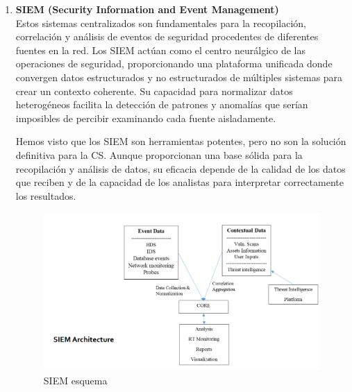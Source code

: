 \begin{enumerate}[resume]
\item \textbf{SIEM (Security Information and Event Management)} \\
Estos sistemas centralizados son fundamentales para la recopilación, correlación y análisis de eventos de seguridad procedentes de diferentes fuentes en la red. Los SIEM actúan como el centro neurálgico de las operaciones de seguridad, proporcionando una plataforma unificada donde convergen datos estructurados y no estructurados de múltiples sistemas para crear un contexto coherente. Su capacidad para normalizar datos heterogéneos facilita la detección de patrones y anomalías que serían imposibles de percibir examinando cada fuente aisladamente.

Hemos visto que los SIEM son herramientas potentes, pero no son la solución definitiva para la CS. Aunque proporcionan una base sólida para la recopilación y análisis de datos, su eficacia depende de la calidad de los datos que reciben y de la capacidad de los analistas para interpretar correctamente los resultados.

\begin{figure}[htbp]
   \centering
   \includegraphics{images/00/SIEM.png}
   \caption{SIEM esquema}
   \label{fig:00/SIEM}
\end{figure}
\end{enumerate}


